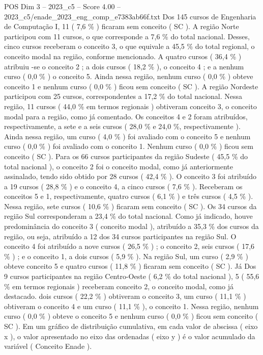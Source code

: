 \begin{textsample}{POS Dim 3 – 2023\_c5 – Score 4.00 – 2023\_c5/enade\_2023\_eng\_comp\_e7383ab66f.txt}
Dos 145 cursos de Engenharia de Computação I, 11 ( 7,6 \% ) ficaram sem conceito ( SC ).
A região Norte participou com 11 cursos, o que corresponde a 7,6 \% do total nacional.
Desses, cinco cursos receberam o conceito 3, o que equivale a 45,5 \% do total regional, o conceito modal na região, conforme mencionado.
A quatro cursos ( 36,4 \% ) atribuiu -se o conceito 2 ; a dois cursos ( 18,2 \% ), o conceito 4 ; e a nenhum curso ( 0,0 \% ) o conceito 5.
Ainda nessa região, nenhum curso ( 0,0 \% ) obteve conceito 1 e nenhum curso ( 0,0 \% ) ficou sem conceito ( SC ).
A região Nordeste participou com 25 cursos, correspondentes a 17,2 \% do total nacional.
Nessa região, 11 cursos ( 44,0 \% em termos regionais ) obtiveram conceito 3, o conceito modal para a região, como já comentado.
Os conceitos 4 e 2 foram atribuídos, respectivamente, a sete e a seis cursos ( 28,0 \% e 24,0 \%, respectivamente ).
Ainda nessa região, um curso ( 4,0 \% ) foi avaliado com o conceito 5 e nenhum curso ( 0,0 \% ) foi avaliado com o conceito 1.
Nenhum curso ( 0,0 \% ) ficou sem conceito ( SC ).
Para os 66 cursos participantes da região Sudeste ( 45,5 \% do total nacional ), o conceito 2 foi o conceito modal, como já anteriormente assinalado, tendo sido obtido por 28 cursos ( 42,4 \% ).
O conceito 3 foi atribuído a 19 cursos ( 28,8 \% ) e o conceito 4, a cinco cursos ( 7,6 \% ).
Receberam os conceitos 5 e 1, respectivamente, quatro cursos ( 6,1 \% ) e três cursos ( 4,5 \% ).
Nessa região, sete cursos ( 10,6 \% ) ficaram sem conceito ( SC ).
Os 34 cursos da região Sul corresponderam a 23,4 \% do total nacional.
Como já indicado, houve predominância do conceito 3 ( conceito modal ), atribuído a 35,3 \% dos cursos da região, ou seja, atribuído a 12 dos 34 cursos participantes na região Sul.
O conceito 4 foi atribuído a nove cursos ( 26,5 \% ) ; o conceito 2, seis cursos ( 17,6 \% ) ; e o conceito 1, a dois cursos ( 5,9 \% ).
Na região Sul, um curso ( 2,9 \% ) obteve conceito 5 e quatro cursos ( 11,8 \% ) ficaram sem conceito ( SC ).
Já Dos 9 cursos participantes na região Centro-Oeste ( 6,2 \% do total nacional ), 5 ( 55,6 \% em termos regionais ) receberam conceito 2, o conceito modal, como já destacado. dois cursos ( 22,2 \% ) obtiveram o conceito 3, um curso ( 11,1 \% ) obtiveram o conceito 4 e um curso ( 11,1 \% ), o conceito 1.
Nessa região, nenhum curso ( 0,0 \% ) obteve o conceito 5 e nenhum curso ( 0,0 \% ) ficou sem conceito ( SC ).
Em um gráfico de distribuição cumulativa, em cada valor de abscissa ( eixo x ), o valor apresentado no eixo das ordenadas ( eixo y ) é o valor acumulado da variável ( Conceito Enade ).

\end{textsample}
